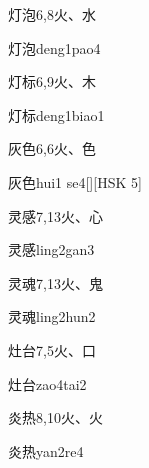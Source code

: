 \begin{entry}{灯泡}{6,8}{⽕、⽔}
  \begin{phonetics}{灯泡}{deng1pao4}
  \end{phonetics}
\end{entry}

\begin{entry}{灯标}{6,9}{⽕、⽊}
  \begin{phonetics}{灯标}{deng1biao1}
  \end{phonetics}
\end{entry}

\begin{entry}{灰色}{6,6}{⽕、⾊}
  \begin{phonetics}{灰色}{hui1 se4}[][HSK 5]
  \end{phonetics}
\end{entry}

\begin{entry}{灵感}{7,13}{⽕、⼼}
  \begin{phonetics}{灵感}{ling2gan3}
  \end{phonetics}
\end{entry}

\begin{entry}{灵魂}{7,13}{⽕、⿁}
  \begin{phonetics}{灵魂}{ling2hun2}
  \end{phonetics}
\end{entry}

\begin{entry}{灶台}{7,5}{⽕、⼝}
  \begin{phonetics}{灶台}{zao4tai2}
  \end{phonetics}
\end{entry}

\begin{entry}{炎热}{8,10}{⽕、⽕}
  \begin{phonetics}{炎热}{yan2re4}
  \end{phonetics}
\end{entry}

